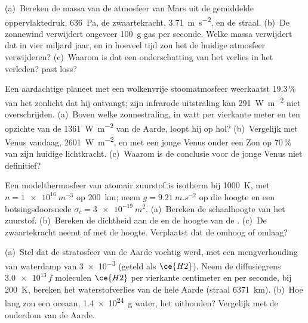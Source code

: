 \begin{exercise}[$\star\star$]\label{exo:b3:planetary-atmospheres:8}
(a)~Bereken de massa van de atmosfeer van Mars uit de gemiddelde
oppervlaktedruk, \qty{636}{Pa}, de zwaartekracht, \qty{3.71}{m.s^{-2}}, en
de straal. (b)~De zonnewind verwijdert ongeveer \qty{100}{g} gas per seconde. Welke massa verwijdert dat in vier miljard jaar, en in hoeveel tijd zou
het de huidige atmosfeer verwijderen? (c)~Waarom is dat een onderschatting van het
verlies in het verleden?
past loss?
\end{exercise}

\begin{exercise}[$\star\star$]\label{exo:b3:planetary-atmospheres:9}
Een aardachtige planeet met een wolkenvrije stoomatmosfeer weerkaatst 19.3\,\% van
het zonlicht dat hij ontvangt; zijn infrarode uitstraling kan
\qty{291}{W.m^{-2}} niet overschrijden. (a)~Boven welke zonnestraling, in watt per vierkante
meter en ten opzichte van de \qty{1361}{W.m^{-2}} van de Aarde, loopt hij op hol?
(b)~Vergelijk met Venus vandaag, \qty{2601}{W.m^{-2}}, en met een jonge Venus
onder een Zon op 70\,\% van zijn huidige lichtkracht. (c)~Waarom is de
conclusie voor de jonge Venus niet definitief?
\end{exercise}

\begin{exercise}[$\star\star\star$]\label{exo:b3:planetary-atmospheres:10}
Een modelthermosfeer van atomair zuurstof is isotherm bij \qty{1000}{K}, met
$n = \qty{1e16}{m^{-3}}$ op \qty{200}{km}; neem $g =
\qty{9.21}{m.s^{-2}}$ op die hoogte en een botsingsdoorsnede
$\sigma_c = \qty{3e-19}{m^2}$. (a)~Bereken de schaalhoogte van het zuurstof.
(b)~Bereken de dichtheid aan de  en de hoogte van de .
(c)~De zwaartekracht neemt af met de hoogte. Verplaatst dat de  omhoog of
omlaag?
\end{exercise}

\begin{exercise}[$\star\star\star$]\label{exo:b3:planetary-atmospheres:11}
(a)~Stel dat de stratosfeer van de Aarde vochtig werd, met een mengverhouding van
waterdamp van \num{3e-3} (geteld als $\ce{H2}$). Neem de diffusiegrens
$\num{3.0e13}\,f$ moleculen $\ce{H2}$ per vierkante centimeter en
per seconde, bij \qty{200}{K}, bereken het waterstofverlies van de hele
Aarde (straal \qty{6371}{km}). (b)~Hoe lang zou een oceaan,
\qty{1.4e24}{g} water, het uithouden? Vergelijk met de ouderdom van de Aarde.
\end{exercise}

